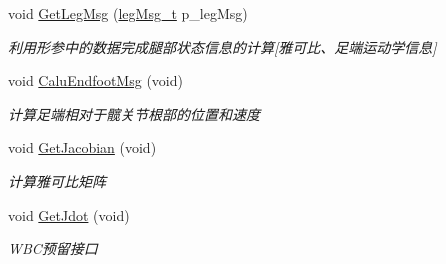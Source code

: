 \begin{DoxyCompactItemize}
void \hyperlink{classquadruped_1_1LegStateEstimate_a145521c0273b7f45c3a48e1a268ce6c7}{Get\+Leg\+Msg} (\hyperlink{structlegMsg__t}{leg\+Msg\+\_\+t} p\+\_\+leg\+Msg)
\begin{DoxyCompactList}\small\item\em 利用形参中的数据完成腿部状态信息的计算\mbox{[}雅可比、足端运动学信息\mbox{]} \end{DoxyCompactList}\item 
\mbox{\label{classquadruped_1_1LegStateEstimate_a52454c0e1a587e73e1bab0187e925c35}} 
void \hyperlink{classquadruped_1_1LegStateEstimate_a52454c0e1a587e73e1bab0187e925c35}{Calu\+Endfoot\+Msg} (void)
\begin{DoxyCompactList}\small\item\em 计算足端相对于髋关节根部的位置和速度 \end{DoxyCompactList}\item 
\mbox{\label{classquadruped_1_1LegStateEstimate_ae5d15d8588c3b2aa7e5b8c40d17be99a}} 
void \hyperlink{classquadruped_1_1LegStateEstimate_ae5d15d8588c3b2aa7e5b8c40d17be99a}{Get\+Jacobian} (void)
\begin{DoxyCompactList}\small\item\em 计算雅可比矩阵 \end{DoxyCompactList}\item 
\mbox{\label{classquadruped_1_1LegStateEstimate_a7937d68ab5083c1325cfff39cee33680}} 
void \hyperlink{classquadruped_1_1LegStateEstimate_a7937d68ab5083c1325cfff39cee33680}{Get\+Jdot} (void)
\begin{DoxyCompactList}\small\item\em W\+B\+C预留接口 \end{DoxyCompactList}\end{DoxyCompactItemize}
